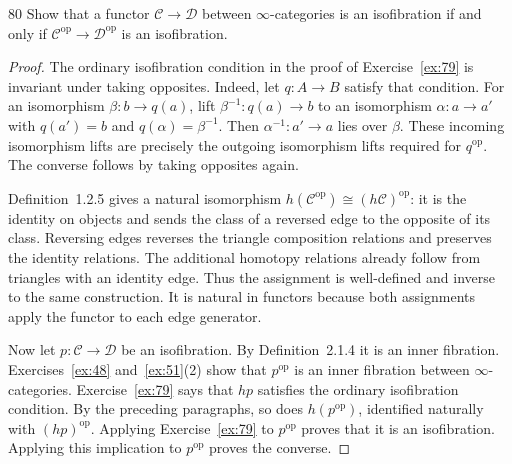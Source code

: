 \begin{exercise}{80}
Show that a functor $\mathcal C\to\mathcal D$ between $\infty$-categories is an
isofibration if and only if $\mathcal C^{\mathrm{op}}\to\mathcal D^{\mathrm{op}}$
is an isofibration.

\begin{proof}
The ordinary isofibration condition in the proof of
Exercise~\ref{ex:79} is invariant under taking opposites.
Indeed, let $q\colon A\to B$ satisfy that condition.
For an isomorphism $\beta\colon b\to q(a)$, lift
$\beta^{-1}\colon q(a)\to b$ to an isomorphism
$\alpha\colon a\to a'$ with $q(a')=b$ and
$q(\alpha)=\beta^{-1}$.
Then $\alpha^{-1}\colon a'\to a$ lies over $\beta$.
These incoming isomorphism lifts are precisely the outgoing
isomorphism lifts required for $q^{\mathrm{op}}$.
The converse follows by taking opposites again.

Definition~1.2.5 gives a natural isomorphism
$h(\mathcal C^{\mathrm{op}})\cong(h\mathcal C)^{\mathrm{op}}$:
it is the identity on objects and sends the class of a reversed
edge to the opposite of its class.
Reversing edges reverses the triangle composition relations
and preserves the identity relations.
The additional homotopy relations already follow from
triangles with an identity edge.
Thus the assignment is well-defined and inverse to the
same construction.
It is natural in functors because both assignments apply
the functor to each edge generator.

Now let $p\colon\mathcal C\to\mathcal D$ be an isofibration.
By Definition~2.1.4 it is an inner fibration.
Exercises~\ref{ex:48} and~\ref{ex:51}(2) show that
$p^{\mathrm{op}}$ is an inner fibration between
$\infty$-categories.
Exercise~\ref{ex:79} says that $hp$ satisfies the ordinary
isofibration condition.
By the preceding paragraphs, so does $h(p^{\mathrm{op}})$,
identified naturally with $(hp)^{\mathrm{op}}$.
Applying Exercise~\ref{ex:79} to $p^{\mathrm{op}}$ proves
that it is an isofibration.
Applying this implication to $p^{\mathrm{op}}$ proves the converse.
\end{proof}
\end{exercise}
